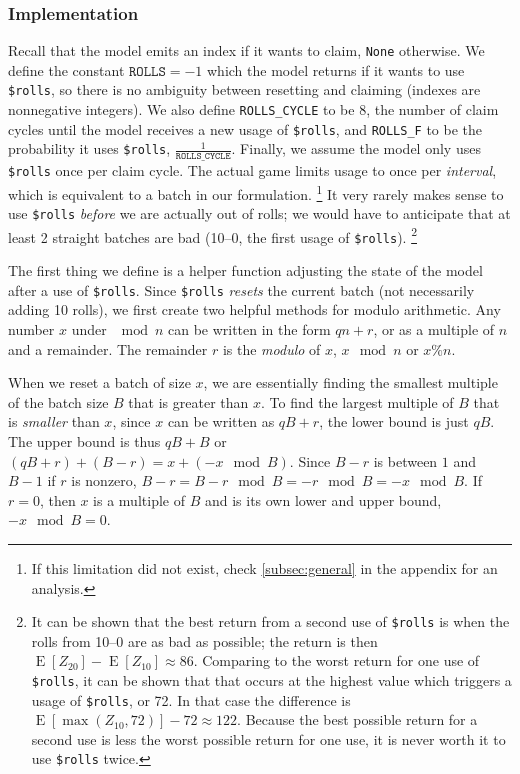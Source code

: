 \documentclass[11pt, oneside]{article}
\DeclareMathOperator{\E}{E}
\theoremstyle{plain}
\theoremstyle{definition}
\begin{document}
\subsubsection{Implementation}
Recall that the model emits an index if it wants to claim,
\texttt{None} otherwise. We define the constant \( \texttt{ROLLS}
= -1 \) which the model returns if it wants to use \texttt{\$rolls}, so there
is no ambiguity between resetting and claiming (indexes are nonnegative
integers). We also define \texttt{ROLLS\_CYCLE} to be 8, the number of
claim cycles until the model receives a new usage of \texttt{\$rolls},
and \texttt{ROLLS\_F} to be the probability it uses \texttt{\$rolls}, \(
\frac{1}{\texttt{ROLLS\_CYCLE}} \). Finally, we assume the model only uses
\texttt{\$rolls} once per claim cycle. The actual game limits usage to once
per \textit{interval}, which is equivalent to a batch in our formulation.
\footnote{If this limitation did not exist, check
\autoref{subsec:general} in the appendix for an analysis.}
It very rarely makes sense to use \texttt{\$rolls} \textit{before} we
are actually out of rolls; we would have to anticipate that at least 2
straight batches are bad (10--0, the first usage of \texttt{\$rolls}).
\footnote{It can be shown that the best return from a second use of
\texttt{\$rolls} is when the rolls from 10--0 are as bad as possible; the
return is then \( \E[Z_{20}] - \E[Z_{10}] \approx 86 \). Comparing to the
worst return for one use of \texttt{\$rolls}, it can be shown that that occurs
at the highest value which triggers a usage of \texttt{\$rolls}, or 72. In
that case the difference is \( \E[\max(Z_{10}, 72)] - 72 \approx 122 \).
Because the best possible return for a second use is less the worst possible
return for one use, it is never worth it to use \texttt{\$rolls} twice.}

The first thing we define is a helper function adjusting the state
of the model after a use of \texttt{\$rolls}. Since \texttt{\$rolls}
\textit{resets} the current batch (not necessarily adding 10 rolls),
we first create two helpful methods for modulo arithmetic. Any number
\( x \) under \( \mod n \) can be written in the form \( qn + r \),
or as a multiple of \( n \) and a remainder. The remainder \( r \) is
the \textit{modulo} of \( x \), \( x \mod n \) or \( x \% n \).

When we reset a batch of size \( x \), we are essentially finding the smallest
multiple of the batch size \( B \) that is greater than \( x \). To find the
largest multiple of \( B \) that is \textit{smaller} than \( x \), since \( x
\) can be written as \( qB + r \), the lower bound is just \( qB \). The upper
bound is thus \( qB + B \) or \( (qB + r) + (B - r) = x + (-x \mod B) \). Since
\( B - r \) is between \( 1 \) and \( B - 1\) if \( r \) is nonzero, \( B - r
= B - r \mod B = -r \mod B = -x \mod B \). If \( r = 0 \), then \( x \) is a
multiple of \( B \) and is its own lower and upper bound, \( -x \mod B = 0 \).
\end{document}
